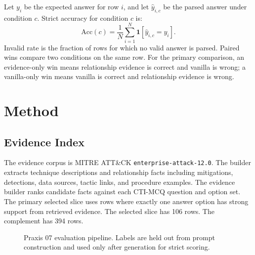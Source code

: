 \documentclass[10pt]{article}
\begin{document}
Let \(y_i\) be the expected answer for row \(i\), and let \(\hat{y}_{i,c}\) be the parsed answer under condition \(c\).
Strict accuracy for condition \(c\) is:
\[
\mathrm{Acc}(c) = \frac{1}{N}\sum_{i=1}^{N} \mathbf{1}[\hat{y}_{i,c}=y_i].
\]
Invalid rate is the fraction of rows for which no valid answer is parsed.
Paired wins compare two conditions on the same row.
For the primary comparison, an evidence-only win means relationship evidence is correct and vanilla is wrong; a vanilla-only win means vanilla is correct and relationship evidence is wrong.

\section{Method}

\subsection{Evidence Index}

The evidence corpus is MITRE ATT\&CK \texttt{enterprise-attack-12.0}.
The builder extracts technique descriptions and relationship facts including mitigations, detections, data sources, tactic links, and procedure examples.
The evidence builder ranks candidate facts against each CTI-MCQ question and option set.
The primary selected slice uses rows where exactly one answer option has strong support from retrieved evidence.
The selected slice has 106 rows.
The complement has 394 rows.

\begin{figure}[H]
  \centering
  \caption{Praxis 07 evaluation pipeline. Labels are held out from prompt construction and used only after generation for strict scoring.}
  \label{fig:pipeline}
\end{figure}
\end{document}
